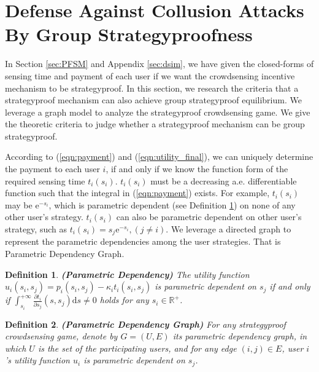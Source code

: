 \documentclass[conference]{IEEEtran}
\newtheorem{definition}{Definition}
\theoremstyle{definition}
\begin{document}
\section{Defense Against Collusion Attacks By Group Strategyproofness}
\label{sec:GSIM}
{\color{black}
In Section \ref{sec:PFSM} and Appendix \ref{sec:dsim}, we have given the closed-forms of sensing time and payment of each user if we want the crowdsensing incentive mechanism to be strategyproof. In this section, we research the criteria that a strategyproof mechanism can also achieve group strategyproof equilibrium.
}
We leverage a graph model to analyze the strategyproof crowdsensing game. We give the theoretic criteria to judge whether a strategyproof mechanism can be group strategyproof.

According to (\ref{eqn:payment}) and (\ref{eqn:utility_final}), we can uniquely determine the payment to each user $i$, if and only if we know the function form of the required sensing time $t_i(s_i)$. $t_i(s_i)$ must be a decreasing a.e. differentiable function such that the integral in (\ref{eqn:payment}) exists. For example, $t_i(s_i)$ may be $\mathrm{e}^{-s_i}$, which is parametric dependent (see Definition \ref{def:pd}) on none of any other user\rq{}s strategy. $t_i(s_i)$ can also be parametric dependent on other user\rq{}s strategy, such as $t_i(s_i)=s_j\mathrm{e}^{-s_i},(j\not=i)$. We leverage a directed graph to represent the parametric dependencies among the user strategies. That is Parametric Dependency Graph.
{\color{blue}
\begin{definition}
\label{def:pd}
\textbf{(Parametric Dependency)} The utility function $u_i(s_i,s_j)=p_i(s_i,s_j)-\kappa_it_i(s_i,s_j)$ is parametric dependent on $s_j$ if and only if $\int_{s_i}^{+\infty}\frac{\partial t_i}{\partial s_j}(s,s_j)\mathrm{d}s\not=0$ holds for any $s_i\in\mathbb{R}^+$.
\end{definition}
}
\begin{definition}
\label{def:PDG}
\textbf{(Parametric Dependency Graph)} For any strategyproof crowdsensing game, denote by $G=(U,E)$ its parametric dependency graph, in which $U$ is the set of the participating users, and for any edge $(i,j)\in E$, user $i$\rq{}s utility function $u_i$ is parametric dependent on $s_j$.
\end{definition}
\end{document}
